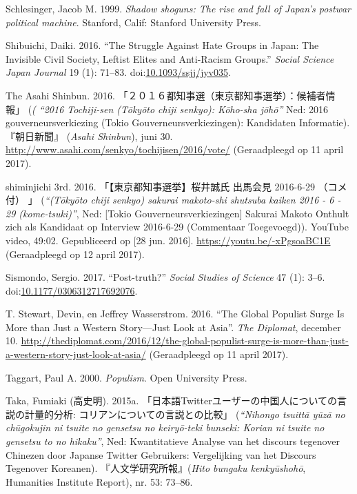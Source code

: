 \documentclass[10.5pt,dutch,]{article}
\begin{document}
\hypertarget{ref-schlesingerux5fshadowux5f1999}{}
Schlesinger, Jacob M. 1999. \emph{Shadow shoguns: The rise and fall of
Japan's postwar political machine}. Stanford, Calif: Stanford University
Press.

\hypertarget{ref-shibuichiux5fstruggleux5f2016}{}
Shibuichi, Daiki. 2016. “The Struggle Against Hate Groups in Japan: The
Invisible Civil Society, Leftist Elites and Anti-Racism Groups.”
\emph{Social Science Japan Journal} 19 (1): 71--83.
doi:\href{https://doi.org/10.1093/ssjj/jyv035}{10.1093/ssjj/jyv035}.

\hypertarget{ref-asahiux5fshimbunux5felectionsux5f2016}{}
The Asahi Shinbun. 2016. 「２０１６都知事選（東京都知事選挙）：候補者情報」 (\emph{( “2016 Tochiji-sen (Tōkyōto chiji senkyo): Kōho-sha jōhō”} Ned: 2016 gouverneursverkiezing (Tokio Gouverneursverkiezingen): Kandidaten Informatie). 『朝日新聞』 (\emph{Asahi Shinbun}), juni 30. \url{http://www.asahi.com/senkyo/tochijisen/2016/vote/} (Geraadpleegd op 11 april 2017).

\hypertarget{ref-shiminjichiux5f3rdux5ftokyochijiux5f2016}{}
shiminjichi 3rd. 2016. 「【東京都知事選挙】桜井誠氏 出馬会見 2016-6-29 （コメ付） 」 (\emph{“(Tōkyōto chiji senkyo) sakurai makoto-shi shutsuba kaiken 2016 - 6 - 29 (kome-tsuki)”}, Ned: [Tokio Gouverneursverkiezingen] Sakurai Makoto Onthult zich als Kandidaat op Interview 2016-6-29 (Commentaar Toegevoegd)). YouTube video, 49:02. Gepubliceerd op [28 jun. 2016]. \url{https://youtu.be/-xPgsoaBC1E} (Geraadpleegd op 12 april 2017).

\hypertarget{ref-sismondoux5fpost-truthux3fux5f2017}{}
Sismondo, Sergio. 2017. “Post-truth?” \emph{Social Studies of Science} 47
(1): 3--6.
doi:\href{https://doi.org/10.1177/0306312717692076}{10.1177/0306312717692076}.

\hypertarget{ref-t.ux5fstewartux5fglobalux5f2016}{}
T. Stewart, Devin, en Jeffrey Wasserstrom. 2016. “The Global Populist Surge Is More than Just a Western Story—Just Look at Asia”. \emph{The Diplomat}, december 10. \url{http://thediplomat.com/2016/12/the-global-populist-surge-is-more-than-just-a-western-story-just-look-at-asia/} (Geraadpleegd op 11 april 2017).

\hypertarget{ref-taggartux5fpopulismux5f2000}{}
Taggart, Paul A. 2000. \emph{Populism}. Open University Press.

\hypertarget{ref-takaux5ftwitterux5f2015-1}{}
Taka, Fumiaki (高史明). 2015a. 「日本語Twitterユーザーの中国人についての言説の計量的分析: コリアンについての言説との比較」 (\emph{“Nihongo tsuittā yūzā no chūgokujin ni tsuite no gensetsu no keiryō-teki bunseki: Korian ni tsuite no gensetsu to no hikaku”}, Ned: Kwantitatieve Analyse van het discours tegenover Chinezen door Japanse Twitter Gebruikers: Vergelijking van het Discours Tegenover Koreanen).  『人文学研究所報』(\emph{Hito bungaku kenkyūshohō}, Humanities Institute Report), nr. 53: 73–86.
\end{document}
